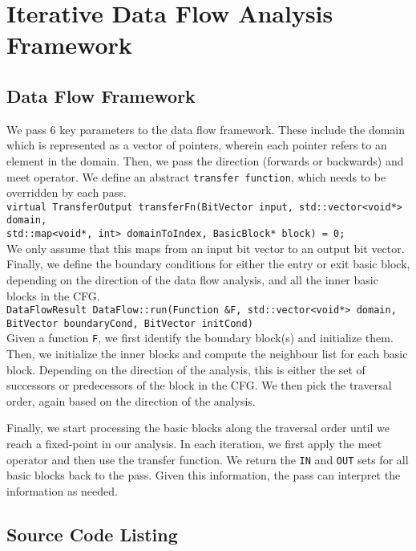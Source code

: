 \section{Iterative Data Flow Analysis Framework}

\subsection{Data Flow Framework}

We pass $6$ key parameters to the data flow framework. These include the domain
which is represented as a vector of pointers, wherein each pointer refers to
an element in the domain.
Then, we pass the direction (forwards or backwards) and meet operator.
We define an abstract \texttt{transfer function}, which needs to be overridden
by each pass.\\

\texttt{virtual TransferOutput transferFn(BitVector input,
  std::vector<void*> domain,\\
  std::map<void*, int> domainToIndex,
  BasicBlock* block) = 0;
}\\

We only assume that this maps from an input bit vector to an output bit vector.
Finally, we define the boundary conditions for either the entry or exit basic
block, depending on the direction of the data flow analysis, and
all the inner basic blocks in the CFG.\\

\texttt{DataFlowResult DataFlow::run(Function \&F, std::vector<void*> domain,
  BitVector boundaryCond, BitVector initCond)}\\

Given a function \texttt{F}, we first identify the boundary block(s) and initialize them.
Then, we initialize the inner blocks and compute the neighbour list for each
basic block. Depending on the direction of the analysis, this is either the
set of successors or predecessors of the block in the CFG. We then pick the traversal order,
again based on the direction of the analysis.

Finally, we start processing the basic blocks along the traversal order
until we reach a fixed-point in our analysis.
In each iteration, we first apply the meet operator and then use
the transfer function. We return the \texttt{IN} and \texttt{OUT} sets for all basic blocks back to the
pass. Given this information, the pass can interpret the information as needed.

\subsection{Source Code Listing}

